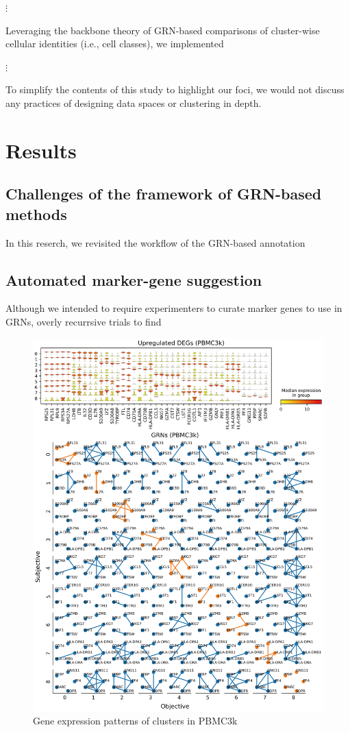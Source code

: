 \documentclass{article}
\begin{document}
$\vdots$

Leveraging the backbone theory of GRN-based comparisons of cluster-wise
cellular identities (i.e., cell classes), we implemented 

$\vdots$

To simplify the contents of this study to highlight our foci, we would not 
discuss any practices of designing data spaces or clustering in depth.

\section*{Results}
\subsection*{Challenges of the framework of GRN-based methods}
In this reserch, we revisited the workflow of the GRN-based annotation


\subsection*{Automated marker-gene suggestion}
Although we intended to require experimenters to curate marker genes to use
in GRNs, overly recurrsive trials to find 

\begin{figure}[htb]
  \centering
  \includegraphics[scale=0.6]{./figs/exported/figure_s1.png}
  \caption{Gene expression patterns of clusters in PBMC3k}
  \label{bc}
\end{figure}
\end{document}
